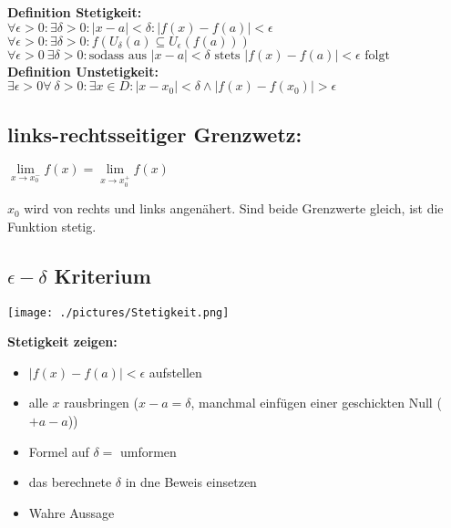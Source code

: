 
\textbf{Definition Stetigkeit:}\\
$\forall \epsilon > 0 :\exists \delta > 0 : |x-a|<\delta : |f(x)-f(a)|<\epsilon$\\
$\forall \epsilon > 0 :\exists \delta > 0 : f(U_{\delta}(a) \subseteq U_{\epsilon}(f(a)))$\\
$\forall \epsilon > 0\  \exists \delta >0 : \text{sodass aus } |x-a|<\delta \text{ stets } |f(x)-f(a)|<\epsilon \text{ folgt}$\\

\textbf{Definition Unstetigkeit:} $\exists \epsilon > 0 \forall\  \delta > 0 :\exists x \in D : |x-x_0|< \delta \wedge |f(x)-f(x_0)|>\epsilon$

\subsection{links-rechtsseitiger Grenzwetz:}

$\lim\limits_{x\to x_0^-}f(x) = \lim\limits_{x\to x_0^+} f(x)$

$x_0$ wird von rechts und links angenähert. Sind beide Grenzwerte gleich, ist die Funktion stetig.


\subsection{\(\epsilon - \delta\) Kriterium}



\texttt{[image: ./pictures/Stetigkeit.png]}

\textbf{Stetigkeit zeigen:}
\begin{itemize}
    \item $|f(x)-f(a)|<\epsilon$ aufstellen
    \item alle $x$ rausbringen ($x-a = \delta$, manchmal einfügen einer geschickten Null ($+ a - a$))
    \item Formel auf $\delta=$ umformen
    \item das berechnete $\delta$ in dne Beweis einsetzen
    \item Wahre Aussage
\end{itemize}



